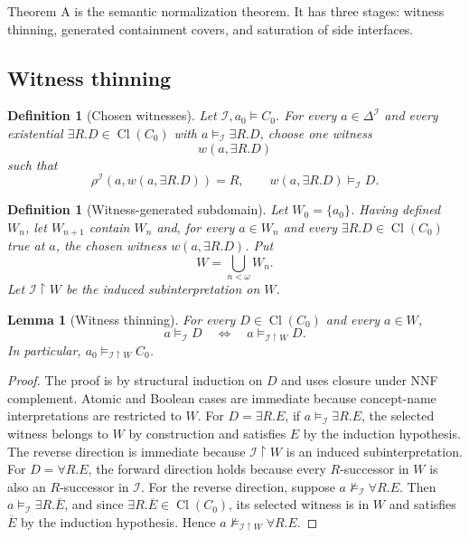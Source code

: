 \documentclass[11pt]{article}
\newtheorem{lemma}[theorem]{Lemma}
\newtheorem{definition}[theorem]{Definition}
\newcommand{\Cl}{\operatorname{Cl}}
\newcommand{\restrict}{\upharpoonright}
\begin{document}
Theorem A is the semantic normalization theorem.  It has three stages: witness thinning, generated containment covers, and saturation of side interfaces.

\subsection{Witness thinning}

\begin{definition}[Chosen witnesses]
Let $\mathcal I,a_0\models C_0$.  For every $a\in\Delta^\mathcal I$ and every existential $\exists R.D\in\Cl(C_0)$ with $a\models_\mathcal I\exists R.D$, choose one witness
\[
  w(a,\exists R.D)
\]
such that
\[
  \rho^\mathcal I(a,w(a,\exists R.D))=R,
  \qquad
  w(a,\exists R.D)\models_\mathcal I D.
\]
\end{definition}

\begin{definition}[Witness-generated subdomain]
Let $W_0=\{a_0\}$.  Having defined $W_n$, let $W_{n+1}$ contain $W_n$ and, for every $a\in W_n$ and every $\exists R.D\in\Cl(C_0)$ true at $a$, the chosen witness $w(a,\exists R.D)$.  Put
\[
  W=\bigcup_{n<\omega} W_n.
\]
Let $\mathcal I\restrict W$ be the induced subinterpretation on $W$.
\end{definition}

\begin{lemma}[Witness thinning]
For every $D\in\Cl(C_0)$ and every $a\in W$,
\[
  a\models_\mathcal I D
  \quad\Longleftrightarrow\quad
  a\models_{\mathcal I\restrict W} D.
\]
In particular, $a_0\models_{\mathcal I\restrict W}C_0$.
\end{lemma}

\begin{proof}
The proof is by structural induction on $D$ and uses closure under NNF complement.  Atomic and Boolean cases are immediate because concept-name interpretations are restricted to $W$.  For $D=\exists R.E$, if $a\models_\mathcal I\exists R.E$, the selected witness belongs to $W$ by construction and satisfies $E$ by the induction hypothesis.  The reverse direction is immediate because $\mathcal I\restrict W$ is an induced subinterpretation.  For $D=\forall R.E$, the forward direction holds because every $R$-successor in $W$ is also an $R$-successor in $\mathcal I$.  For the reverse direction, suppose $a\not\models_\mathcal I\forall R.E$.  Then $a\models_\mathcal I\exists R.\overline E$, and since $\exists R.\overline E\in\Cl(C_0)$, its selected witness is in $W$ and satisfies $\overline E$ by the induction hypothesis.  Hence $a\not\models_{\mathcal I\restrict W}\forall R.E$.
\end{proof}
\end{document}
